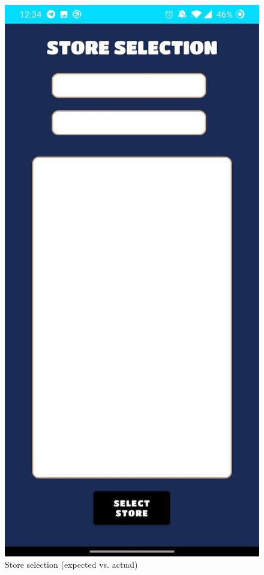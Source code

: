 \documentclass[table, 12pt]{article}
\begin{document}
\begin{figure}[!tbp]
\begin{minipage}[b]{0.4\textwidth}
    \end{minipage}
    \hfill
    \begin{minipage}[b]{0.4\textwidth}
        \includegraphics[width=\textwidth]{assets/screenshots/white_label_issue.jpg}
    \end{minipage}
    \caption{Store selection (expected vs. actual)}
    \label{white_label_issue}
\end{figure}
\end{document}
